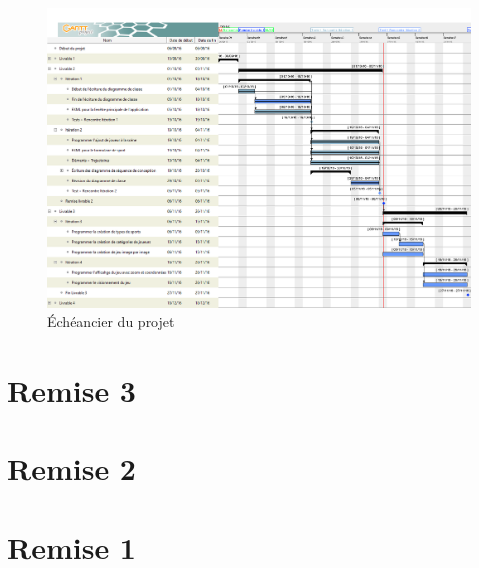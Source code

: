\documentclass[ULlof]{ULrapport}
\begin{document}
\begin{figure}[p]
	\centering
	\includegraphics[scale=0.35, angle=90]{fig/diagrams4/gantt.png}
	\caption{Échéancier du projet}
	\label{fig:gantt}
\end{figure}

\appendix

\chapter{Remise 3}


\chapter{Remise 2}


\chapter{Remise 1}

\end{document}
